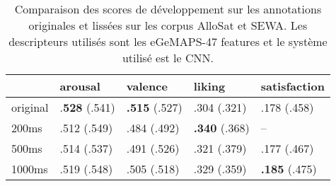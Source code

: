 \begin{table}[htp!]
    \centering
    \begin{tabular}{| l| l  l  l  | l |}
        \hline
                    &arousal    &valence   &liking &satisfaction \\
        \hline
        original         &.\textbf{528} (.541) &\textbf{.515} (.527) &.304 (.321) &.178 (.458) \\
        200ms           &.512 (.549) &.484 (.492) &\textbf{.340} (.368) &-- \\
        500ms           &.514 (.537) &.491 (.526) &.321 (.379) &.177 (.467) \\
        1000ms          &.519 (.548) &.505 (.518) &.329 (.359) &\textbf{.185} (.475)\\
        \hline
    \end{tabular}
    \caption{Comparaison des scores de développement sur les annotations originales et lissées sur les corpus AlloSat et SEWA. Les descripteurs utilisés sont les eGeMAPS-47 features et le système utilisé est le CNN.}
    \label{tab:allosatLisse}
\end{table}
